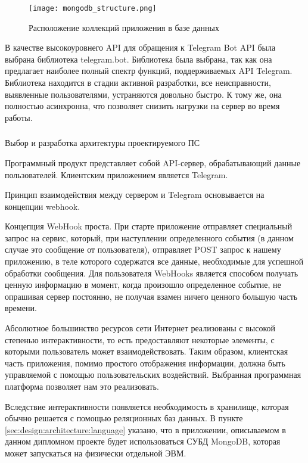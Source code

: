 \begin{figure}[!h]
	\centering
	\texttt{[image: mongodb\_structure.png]} 
	\caption{Расположение коллекций приложения в базе данных}
	\label{fig:analysis:structure:mongo}
\end{figure}

В качестве высокоуровнего API для обращения к Telegram Bot API была выбрана библиотека telegram.bot. Библиотека была выбрана, так как она предлагает наиболее полный спектр функций, поддерживаемых API Telegram. Библиотека находится в стадии активной разработки, все неисправности, выявленные пользователями, устраняются довольно быстро. К тому же, она полностью асинхронна, что позволяет снизить нагрузки на сервер во время работы.

\subsubsection{} Выбор и разработка архитектуры проектируемого ПС
\label{sec:design:architecture:architecture}

Программный продукт представляет собой API-сервер, обрабатывающий
данные пользователей. Клиентским приложением является Telegram.

Принцип взаимодействия между сервером и Telegram основывается на концепции webhook.

Концепция WebHook проста. При старте приложение отправляет специальный запрос на сервис, который, при наступлении определенного события (в данном случае это сообщение от пользователя), отправляет POST запрос к нашему приложению, в теле которого содержатся все данные, необходимые для успешной обработки сообщения. Для пользователя \linebreak WebHooks является способом получать ценную информацию в момент, когда произошло определенное событие, не опрашивая сервер постоянно, не получая взамен ничего ценного большую часть времени. 

Абсолютное большинство ресурсов сети Интернет реализованы с высокой степенью интерактивности, то есть предоставляют некоторые элементы, с которыми пользователь может взаимодействовать. Таким образом, клиентская часть приложения, помимо простого отображения информации, должна быть управляемой с помощью пользовательских воздействий. Выбранная программная платформа позволяет нам это реализовать.

Вследствие интерактивности появляется необходимость в хранилище, которая обычно решается с помощью реляционных баз данных. В пункте \ref{sec:design:architecture:language} указано, что в приложении, описываемом в данном дипломном проекте будет использоваться СУБД MongoDB, которая может запускаться на физически отдельной ЭВМ.

